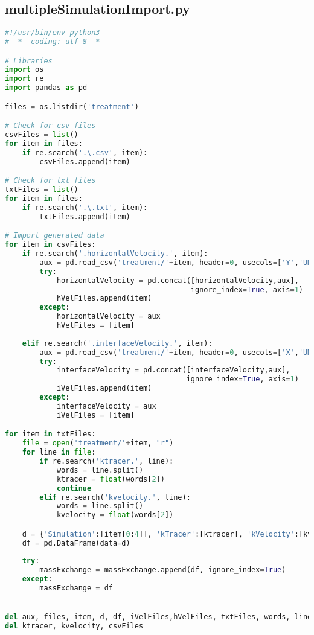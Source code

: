 \subsection{multipleSimulationImport.py}
\begin{lstlisting}[language=python]
#!/usr/bin/env python3
# -*- coding: utf-8 -*-

# Libraries
import os
import re
import pandas as pd

files = os.listdir('treatment')

# Check for csv files
csvFiles = list()
for item in files:
    if re.search('.\.csv', item):
        csvFiles.append(item)

# Check for txt files
txtFiles = list()
for item in files:
    if re.search('.\.txt', item):
        txtFiles.append(item)

# Import generated data
for item in csvFiles:
    if re.search('.horizontalVelocity.', item):
        aux = pd.read_csv('treatment/'+item, header=0, usecols=['Y','UMean'])
        try:
            horizontalVelocity = pd.concat([horizontalVelocity,aux],
                                           ignore_index=True, axis=1)
            hVelFiles.append(item)
        except:
            horizontalVelocity = aux
            hVelFiles = [item]
            
    elif re.search('.interfaceVelocity.', item):
        aux = pd.read_csv('treatment/'+item, header=0, usecols=['X','UMean'])
        try:
            interfaceVelocity = pd.concat([interfaceVelocity,aux],
                                          ignore_index=True, axis=1)
            iVelFiles.append(item)
        except:
            interfaceVelocity = aux
            iVelFiles = [item]

for item in txtFiles:
    file = open('treatment/'+item, "r")
    for line in file:
        if re.search('ktracer.', line):
            words = line.split()
            ktracer = float(words[2])
            continue
        elif re.search('kvelocity.', line):
            words = line.split()
            kvelocity = float(words[2])

    d = {'Simulation':[item[0:4]], 'kTracer':[ktracer], 'kVelocity':[kvelocity]}
    df = pd.DataFrame(data=d)
    
    try:
        massExchange = massExchange.append(df, ignore_index=True)
    except:
        massExchange = df


del aux, files, item, d, df, iVelFiles,hVelFiles, txtFiles, words, line, file
del ktracer, kvelocity, csvFiles
\end{lstlisting}
